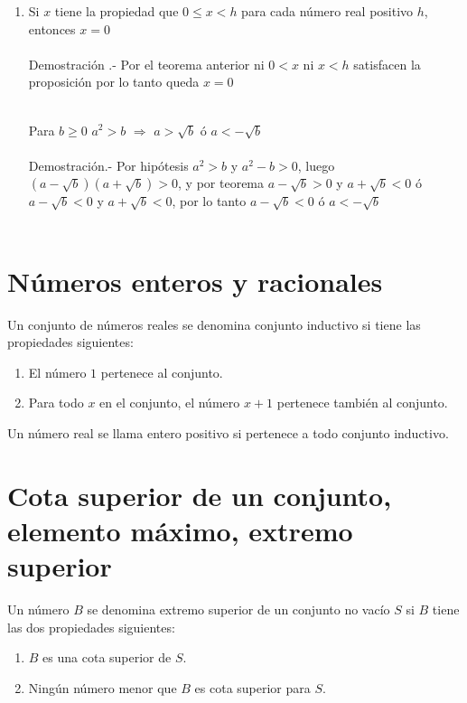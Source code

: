 \begin{enumerate}[\bfseries  1.]
\item Si $x$ tiene la propiedad que $0\leq x < h$ para cada número real positivo $h$, entonces $x=0$\\\\
Demostración .- \; Por el teorema anterior ni $0<x$ ni $x<h$ satisfacen la proposición por lo tanto queda $x=0$\\\\

\begin{lema}
Para $b\geq 0$ $a^2>b$ $\Rightarrow$ $a>\sqrt{b}$ ó $a<-\sqrt{b}$\\\\
Demostración.- \;
Por hipótesis $a^2>b$ y $a^2-b>0$, luego \; $(a-\sqrt{b})(a+\sqrt{b})>0$, y por teorema  \; $a-\sqrt{b}>0$ \; y \; $a+\sqrt{b}<0$ \; ó \; $a-\sqrt{b}<0$ \; y \; $a+\sqrt{b}<0$, por lo tanto $a-\sqrt{b}<0$ \; ó \; $a<-\sqrt{b}$\\\\
\end{lema}
\end{enumerate}

\section{Números enteros y racionales}
\begin{def.}
Un conjunto de números reales se denomina conjunto inductivo si tiene las propiedades siguientes:
\begin{enumerate}[\bfseries a)]
\item El número $1$ pertenece al conjunto.
\item Para todo $x$ en el conjunto, el número $x+1$ pertenece también al conjunto.
\end{enumerate}
\end{def.}
\begin{def.}
Un número real se llama entero positivo si pertenece a todo conjunto inductivo.
\end{def.}

\setcounter{section}{7}
\section{Cota superior de un conjunto, elemento máximo, extremo superior}
\begin{def.}
Un número $B$ se denomina extremo superior de un conjunto no vacío $S$ si $B$ tiene las dos propiedades siguientes:
\begin{enumerate}[\bfseries a)]
\item $B$ es una cota superior de $S$.
\item Ningún número menor que $B$ es cota superior para $S$.
\end{enumerate}
\end{def.}

